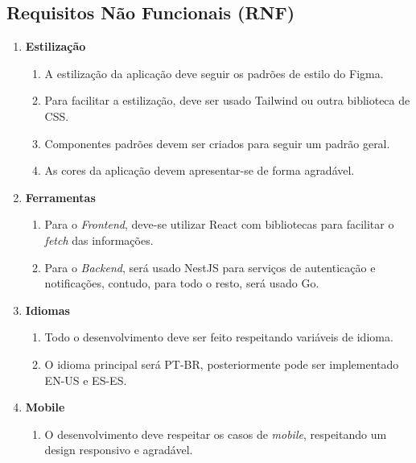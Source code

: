 \documentclass[12pt, a4paper]{article}
\begin{document}
\subsection{Requisitos Não Funcionais (RNF)}
\begin{spacing}{1.5}
\begin{enumerate}[label=RNF\arabic{*}.]
    \item \textbf{Estilização}
    \begin{enumerate}[label=RNF\arabic{*}.0\arabic{*}]
        \item A estilização da aplicação deve seguir os padrões de estilo do Figma.
        \item Para facilitar a estilização, deve ser usado Tailwind ou outra biblioteca de CSS.
        \item Componentes padrões devem ser criados para seguir um padrão geral.
        \item As cores da aplicação devem apresentar-se de forma agradável.
    \end{enumerate}
    \item \textbf{Ferramentas}
    \begin{enumerate}[label=RNF\arabic{*}.0\arabic{*}]
        \item Para o \textit{Frontend}, deve-se utilizar React com bibliotecas para facilitar o \textit{fetch} das informações.
        \item Para o \textit{Backend}, será usado NestJS para serviços de autenticação e notificações, contudo, para todo o resto, será usado Go.
    \end{enumerate}
    \item \textbf{Idiomas}
    \begin{enumerate}[label=RNF\arabic{*}.0\arabic{*}]
        \item Todo o desenvolvimento deve ser feito respeitando variáveis de idioma.
        \item O idioma principal será PT-BR, posteriormente pode ser implementado EN-US e ES-ES.
    \end{enumerate}
    \item \textbf{Mobile}
    \begin{enumerate}[label=RNF04.0\arabic{*}]
        \item O desenvolvimento deve respeitar os casos de \textit{mobile}, respeitando um design responsivo e agradável.
    \end{enumerate}
\end{enumerate}
\end{spacing}
\end{document}
